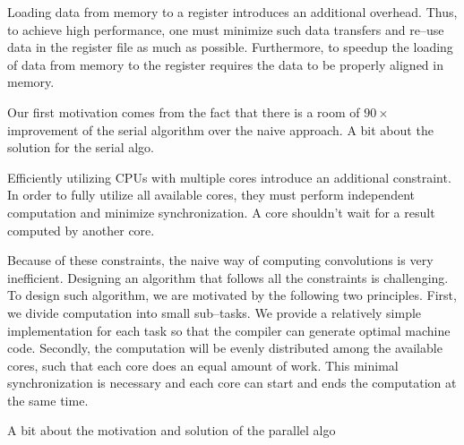   Loading data from memory to a register introduces an additional
  overhead.  Thus, to achieve high performance, one must minimize such
  data transfers and re--use data in the register file as much as
  possible.  Furthermore, to speedup the loading of data from memory
  to the register requires the data to be properly aligned in memory.

  Our first motivation comes from the fact that there is a room of $90
  \times$ improvement of the serial algorithm over the naive approach.
  A bit about the solution for the serial algo.

  Efficiently utilizing CPUs with multiple cores introduce an
  additional constraint.  In order to fully utilize all available
  cores, they must perform independent computation and minimize
  synchronization.  A core shouldn't wait for a result computed by
  another core.

  Because of these constraints, the naive way of computing
  convolutions is very inefficient.  Designing an algorithm that
  follows all the constraints is challenging.  To design such
  algorithm, we are motivated by the following two principles.  First,
  we divide computation into small sub--tasks.  We provide a
  relatively simple implementation for each task so that the compiler
  can generate optimal machine code.  Secondly, the computation will
  be evenly distributed among the available cores, such that each core
  does an equal amount of work.  This minimal synchronization is
  necessary and each core can start and ends the computation at the
  same time.

  A bit about the motivation and solution of the parallel algo
